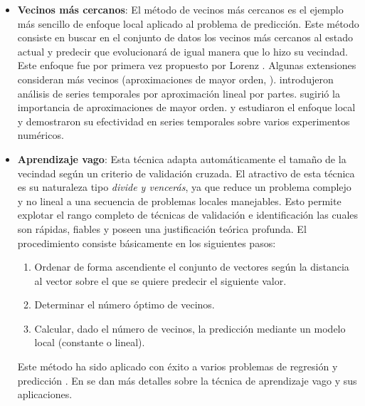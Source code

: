 \documentclass{llncs}
\begin{document}
\begin{itemize}
\item{\textbf{Vecinos más cercanos}}: El método de vecinos más cercanos es el ejemplo más sencillo de enfoque local aplicado al problema de predicción. Este método consiste en buscar en el conjunto de datos los vecinos más cercanos al estado actual y predecir que evolucionará de igual manera que lo hizo su vecindad. Este enfoque fue por primera vez propuesto por Lorenz \cite{LORENZEN1969636}. Algunas extensiones consideran más vecinos (aproximaciones de mayor orden, \cite{Ikeguchi1995}). \cite{Tong1980245} introdujeron análisis de series temporales por aproximación lineal por partes. \cite{Priestley1988} sugirió la importancia de aproximaciones de mayor orden. \cite{Farmer1987845} y \cite{Farmer1988} estudiaron el enfoque local y demostraron su efectividad en series temporales sobre varios experimentos numéricos. 

\item{\textbf{Aprendizaje vago}}: Esta técnica adapta automáticamente el tamaño de la vecindad según un criterio de validación cruzada. El atractivo de esta técnica es su naturaleza tipo \emph{divide y vencerás}, ya que reduce un problema complejo y no lineal a una secuencia de problemas locales manejables. Esto permite explotar el rango completo de técnicas de validación e identificación las cuales son rápidas, fiables y poseen una justificación teórica profunda.
El procedimiento consiste básicamente en los siguientes pasos: 
\begin{enumerate}
\item{} Ordenar de forma ascendiente el conjunto de vectores según la distancia al vector sobre el que se quiere predecir el siguiente valor.
\item{} Determinar el número óptimo de vecinos.
\item{} Calcular, dado el número de vecinos, la predicción mediante un modelo local (constante o lineal).
\end{enumerate}
Este método ha sido aplicado con éxito a varios problemas de regresión y predicción \cite{Bontempi1999}. En \cite{Birattari1999375} \cite{Bontempi199932} se dan más detalles sobre la técnica de aprendizaje vago y sus aplicaciones.
\end{itemize}
\end{document}
